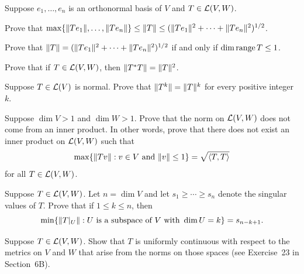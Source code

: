 \begin{exc}
\begin{exercise}
Suppose $e_1,\dots,e_n$ is an orthonormal basis of $V$ and $T\in\mathcal{L}(V,W)$.
\begin{parts}
\item Prove that
  $\max\{\lVert Te_1 \rVert,\dots,\lVert Te_n \rVert\}\le\lVert T \rVert
  \le(\lVert Te_1 \rVert^2+\cdots+\lVert Te_n \rVert^2)^{1/2}$.
\item Prove that $\lVert T \rVert=(\lVert Te_1 \rVert^2+\cdots+\lVert Te_n \rVert^2)^{1/2}$
  if and only if $\operatorname{dim}\operatorname{range} T\le1$.
\end{parts}
\end{exercise}

\begin{exercise}
Prove that if $T\in\mathcal{L}(V,W)$, then $\lVert T^*T \rVert=\lVert T \rVert^2$.
\end{exercise}

\begin{exercise}
Suppose $T\in\mathcal{L}(V)$ is normal. Prove that $\lVert T^k \rVert=\lVert T \rVert^k$ for every
positive integer $k$.
\end{exercise}

\begin{exercise}
Suppose $\dim V>1$ and $\dim W>1$. Prove that the norm on $\mathcal{L}(V,W)$ does not
come from an inner product. In other words, prove that there does not exist an
inner product on $\mathcal{L}(V,W)$ such that
\[ \max\{\lVert Tv \rVert : v\in V \text{ and } \lVert v \rVert\le1\} = \sqrt{\langle T, T \rangle} \]
for all $T\in\mathcal{L}(V,W)$.
\end{exercise}

\begin{exercise}
Suppose $T\in\mathcal{L}(V,W)$. Let $n=\dim V$ and let $s_1\ge\cdots\ge s_n$ denote
the singular values of $T$. Prove that if $1\le k\le n$, then
\[ \min\{\lVert T|_U \rVert : U \text{ is a subspace of } V \text{ with }
   \operatorname{dim} U=k\} = s_{n-k+1}. \]
\end{exercise}

\begin{exercise}
Suppose $T\in\mathcal{L}(V,W)$. Show that $T$ is uniformly continuous with respect to
the metrics on $V$ and $W$ that arise from the norms on those spaces (see
Exercise~23 in Section~6B).
\end{exercise}


\end{exc}
